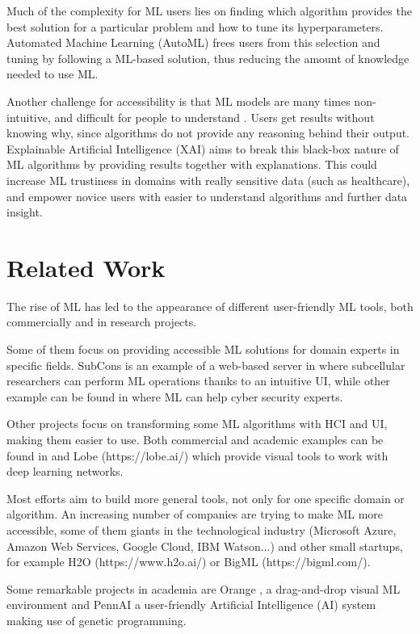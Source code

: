 \documentclass[runningheads]{llncs}
\begin{document}
Much of the complexity for ML users lies on finding which algorithm provides the best solution for a particular problem and how to tune its hyperparameters. Automated Machine Learning (AutoML) frees users from this selection and tuning \cite{4} by following a ML-based solution, thus reducing the amount of knowledge needed to use ML.

Another challenge for accessibility is that ML models are many times non-intuitive, and difficult for people to understand \cite{5}. Users get results without knowing why, since algorithms do not provide any reasoning behind their output. Explainable Artificial Intelligence (XAI) aims to break this black-box nature of ML algorithms by providing results together with explanations. This could increase ML trustiness in domains with really sensitive data (such as healthcare), and empower novice users with easier to understand algorithms and further data insight.

\section{Related Work}

The rise of ML has led to the appearance of different user-friendly ML tools, both commercially and in research projects. 

Some of them focus on providing accessible ML solutions for domain experts in specific fields. SubCons \cite{subcons} is an example of a web-based server in where subcellular researchers can perform ML operations thanks to an intuitive UI, while other example can be found in \cite{cyber} where ML can help cyber security experts.

Other projects focus on transforming some ML algorithms with HCI and UI, making them easier to use. Both commercial and academic examples can be found in \cite{Barista} and Lobe (https://lobe.ai/) which provide visual tools to work with deep learning networks.

Most efforts aim to build more general tools, not only for one specific domain or algorithm. An increasing number of companies are trying to make ML more accessible, some of them giants in the technological industry (Microsoft Azure, Amazon Web Services, Google Cloud, IBM Watson...) and other small startups, for example H2O (https://www.h2o.ai/) or BigML (https://bigml.com/).

Some remarkable projects in academia are Orange \cite{orange}, a drag-and-drop visual ML environment and PennAI \cite{pennAI} a user-friendly Artificial Intelligence (AI) system making use of genetic programming.
\end{document}
